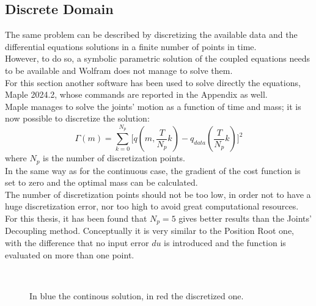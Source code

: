 \documentclass[a4paper,12pt,oneside]{report}
\begin{document}
\subsection{Discrete Domain}
The same problem can be described by discretizing the available data and the differential equations solutions in a finite number of points in time.\\
However, to do so, a symbolic parametric solution of the coupled equations needs to be available and Wolfram does not manage to solve them.\\
For this section another software has been used to solve directly the equations, Maple 2024.2, whose commands are reported in the Appendix as well.\\
Maple manages to solve the joints' motion as a function of time and mass; it is now possible to discretize the solution:
\begin{equation}
  \varGamma(m)=\sum_{k=0}^{N_p}\Big[q(m,\frac{T}{N_p}k)-q_{data}(\frac{T}{N_p}k)\Big]^2
\end{equation}
where $N_p$ is the number of discretization points.\\
In the same way as for the continuous case, the gradient of the cost function is set to zero and the optimal mass can be calculated.\\
The number of discretization points should not be too low, in order not to have a huge discretization error, nor too high to avoid great computational resources.\\
For this thesis, it has been found that $N_p=5$ gives better results than the Joints' Decoupling method. Conceptually it is very similar to the Position Root one, with the difference that no input error $du$ is introduced and the function is evaluated on more than one point.
\begin{figure}[h]
  \centering
  \subfloat[\emph{$N_p=5$.}]
  {} \quad
\subfloat[\emph{$N_p=25$.}]
  {}\\
  \subfloat[\emph{$N_p=50$.}]
  {}
  \caption{In blue the continous solution, in red the discretized one.}
\end{figure}
\newpage
\end{document}

